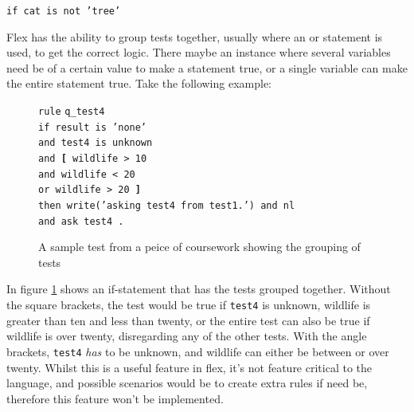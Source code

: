 \documentclass[12pt]{report}
\begin{document}
\begin{center}
\texttt{if cat is not 'tree'}\\
\end{center}
Flex has the ability to group tests together, usually where an or statement is used, to get the correct logic.  There maybe an instance where several variables need be of a certain value to make a statement true, or a single variable can make the entire statement true.  Take the following example:
\begin{figure}[H]
	\begin{tabbing}
		\texttt{rule} \= \texttt{q\_test4}\\
		\> \texttt{if result is 'none'}\\
		\> \texttt{and test4 is unknown}\\
		\> \texttt{and \textbf{[} wildlife > 10}\\
		\> \texttt{and wildlife < 20}\\
		\> \texttt{or wildlife > 20 \textbf{]}}\\
		\> \texttt{then write('asking test4 from test1.') and nl}\\
		\> \texttt{and ask test4 .}\\
	\end{tabbing}
	\caption{A sample test from a peice of coursework showing the grouping of tests}\label{fig:if_grouping}
\end{figure}
In figure \ref{fig:if_grouping} shows an if-statement that has the tests grouped together.  Without the square brackets, the test would be true if \texttt{test4} is unknown, wildlife is greater than ten and less than twenty, or the entire test can also be true if wildlife is over twenty, disregarding any of the other tests.  With the angle brackets, \texttt{test4} \textit{has} to be unknown, and wildlife can either be between or over twenty.  Whilst this is a useful feature in flex, it's not feature critical to the language, and possible scenarios would be to create extra rules if need be, therefore this feature won't be implemented.
\end{document}
